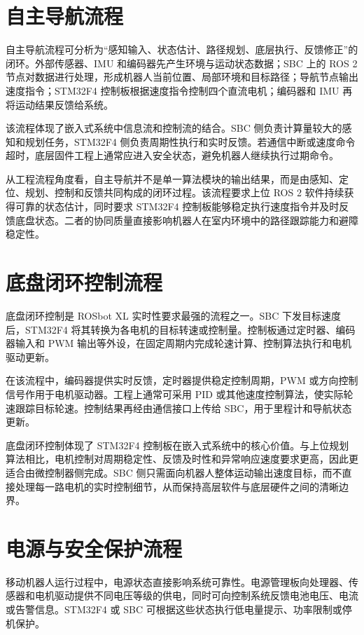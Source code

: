 \documentclass[UTF8,a4paper,12pt]{ctexrep}
\begin{document}
\section{自主导航流程}

自主导航流程可分析为“感知输入、状态估计、路径规划、底层执行、反馈修正”的闭环。外部传感器、IMU 和编码器先产生环境与运动状态数据；SBC 上的 ROS 2 节点对数据进行处理，形成机器人当前位置、局部环境和目标路径；导航节点输出速度指令；STM32F4 控制板根据速度指令控制四个直流电机；编码器和 IMU 再将运动结果反馈给系统。

该流程体现了嵌入式系统中信息流和控制流的结合。SBC 侧负责计算量较大的感知和规划任务，STM32F4 侧负责周期性执行和实时反馈。若通信中断或速度命令超时，底层固件工程上通常应进入安全状态，避免机器人继续执行过期命令。

从工程流程角度看，自主导航并不是单一算法模块的输出结果，而是由感知、定位、规划、控制和反馈共同构成的闭环过程。该流程要求上位 ROS 2 软件持续获得可靠的状态估计，同时要求 STM32F4 控制板能够稳定执行速度指令并及时反馈底盘状态。二者的协同质量直接影响机器人在室内环境中的路径跟踪能力和避障稳定性。

\section{底盘闭环控制流程}

底盘闭环控制是 ROSbot XL 实时性要求最强的流程之一。SBC 下发目标速度后，STM32F4 将其转换为各电机的目标转速或控制量。控制板通过定时器、编码器输入和 PWM 输出等外设，在固定周期内完成轮速计算、控制算法执行和电机驱动更新。

在该流程中，编码器提供实时反馈，定时器提供稳定控制周期，PWM 或方向控制信号作用于电机驱动器。工程上通常可采用 PID 或其他速度控制算法，使实际轮速跟踪目标轮速。控制结果再经由通信接口上传给 SBC，用于里程计和导航状态更新。

底盘闭环控制体现了 STM32F4 控制板在嵌入式系统中的核心价值。与上位规划算法相比，电机控制对周期稳定性、反馈及时性和异常响应速度要求更高，因此更适合由微控制器侧完成。SBC 侧只需面向机器人整体运动输出速度目标，而不直接处理每一路电机的实时控制细节，从而保持高层软件与底层硬件之间的清晰边界。

\section{电源与安全保护流程}

移动机器人运行过程中，电源状态直接影响系统可靠性。电源管理板向处理器、传感器和电机驱动提供不同电压等级的供电，同时可向控制系统反馈电池电压、电流或告警信息。STM32F4 或 SBC 可根据这些状态执行低电量提示、功率限制或停机保护。
\end{document}
